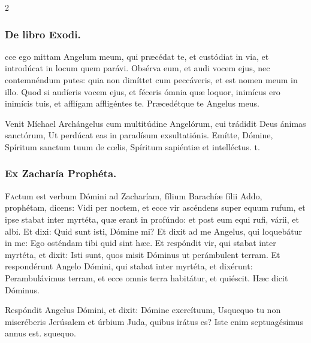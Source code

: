 \documentclass[9pt,twoside]{extarticle}
\begin{document}
\begin{multicols}{2}
\subsubsection*{\center De libro Exodi.}
\begin{center}\end{center}
cce ego mittam Angelum meum, qui præcédat te, et custódiat in via, et introdúcat in locum quem parávi.
Obsérva eum, et audi vocem ejus, nec contemnéndum putes: quia non dimíttet cum peccáveris, et est nomen meum in illo.
Quod si audíeris vocem ejus, et féceris ómnia quæ loquor, inimícus ero inimícis tuis, et afflígam affligéntes te. Præcedétque te Angelus meus.

\begin{tightlist}{}
\item {} Venit Míchael Archángelus cum multitúdine Angelórum, cui trádidit Deus ánimas sanctórum, \textred{*} Ut perdúcat eas in paradísum exsultatiónis.  Emítte, Dómine, Spíritum sanctum tuum de cœlis, Spíritum sapiéntiæ et intelléctus. t.
\end{tightlist}

\subsubsection*{\center Ex Zacharía Prophéta.}
\begin{center}\end{center}
\lettrine{F}actum est verbum Dómini ad Zacharíam, fílium Barachíæ fílii Addo, prophétam, dicens: Vidi per noctem, et ecce vir ascéndens super equum rufum, et ipse stabat inter myrtéta, quæ erant in profúndo: et post eum equi rufi, várii, et albi.
Et dixi: Quid sunt isti, Dómine mi? Et dixit ad me Angelus, qui loquebátur in me: Ego osténdam tibi quid sint hæc.
Et respóndit vir, qui stabat inter myrtéta, et dixit: Isti sunt, quos misit Dóminus ut perámbulent terram.
Et respondérunt Angelo Dómini, qui stabat inter myrtéta, et dixérunt: Perambulávimus terram, et ecce omnis terra habitátur, et quiéscit. Hæc dicit Dóminus.

\begin{tightlist}{}
\item {} Respóndit Angelus Dómini, et dixit: Dómine exercítuum, \textred{*} Usquequo tu non miseréberis Jerúsalem et úrbium Juda, quibus irátus es?  Iste enim septuagésimus annus est. squequo.
\end{tightlist}


\end{multicols}
\end{document}
